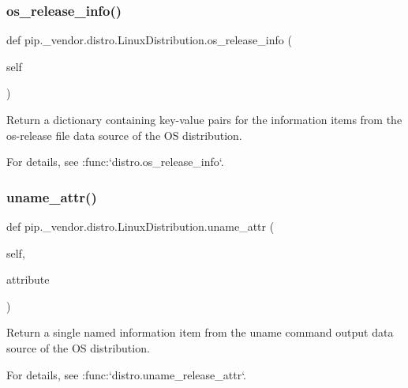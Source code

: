 \subsubsection{\texorpdfstring{os\+\_\+release\+\_\+info()}{os\_release\_info()}}
{\footnotesize\ttfamily def pip.\+\_\+vendor.\+distro.\+Linux\+Distribution.\+os\+\_\+release\+\_\+info (\begin{DoxyParamCaption}\item[{}]{self }\end{DoxyParamCaption})}

\begin{DoxyVerb}Return a dictionary containing key-value pairs for the information
items from the os-release file data source of the OS distribution.

For details, see :func:`distro.os_release_info`.
\end{DoxyVerb}
 \mbox{\label{classpip_1_1__vendor_1_1distro_1_1LinuxDistribution_a82939a6850962797338a64083a30a2ec}} 
\subsubsection{\texorpdfstring{uname\+\_\+attr()}{uname\_attr()}}
{\footnotesize\ttfamily def pip.\+\_\+vendor.\+distro.\+Linux\+Distribution.\+uname\+\_\+attr (\begin{DoxyParamCaption}\item[{}]{self,  }\item[{}]{attribute }\end{DoxyParamCaption})}

\begin{DoxyVerb}Return a single named information item from the uname command
output data source of the OS distribution.

For details, see :func:`distro.uname_release_attr`.
\end{DoxyVerb}
 \mbox{\label{classpip_1_1__vendor_1_1distro_1_1LinuxDistribution_a86202dc77ae2ed3fa849d58ef54a9179}} 
